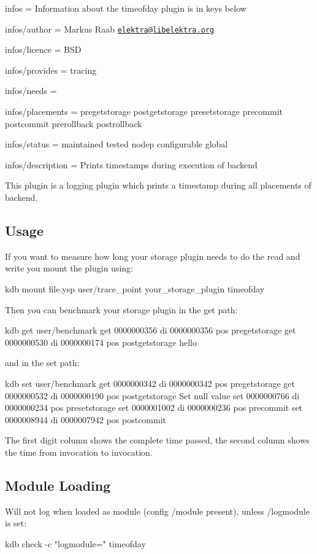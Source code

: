 
\begin{DoxyItemize}
\item infos = Information about the timeofday plugin is in keys below
\item infos/author = Markus Raab \href{mailto:elektra@libelektra.org}{\tt elektra@libelektra.\+org}
\item infos/licence = B\+SD
\item infos/provides = tracing
\item infos/needs =
\item infos/placements = pregetstorage postgetstorage presetstorage precommit postcommit prerollback postrollback
\item infos/status = maintained tested nodep configurable global
\item infos/description = Prints timestamps during execution of backend
\end{DoxyItemize}

This plugin is a logging plugin which prints a timestamp during all placements of backend.

\subsection*{Usage}

If you want to measure how long your storage plugin needs to do the read and write you mount the plugin using\+: \begin{DoxyVerb}kdb mount file.ysp user/trace_point your_storage_plugin timeofday
\end{DoxyVerb}


Then you can benchmark your storage plugin in the get path\+: \begin{DoxyVerb}kdb get user/benchmark
get     0000000356      di      0000000356      pos     pregetstorage
get     0000000530      di      0000000174      pos     postgetstorage
hello
\end{DoxyVerb}


and in the set path\+: \begin{DoxyVerb}kdb set user/benchmark
get     0000000342      di      0000000342      pos     pregetstorage
get     0000000532      di      0000000190      pos     postgetstorage
Set null value
set     0000000766      di      0000000234      pos     presetstorage
set     0000001002      di      0000000236      pos     precommit
set     0000008944      di      0000007942      pos     postcommit
\end{DoxyVerb}


The first digit column shows the complete time passed, the second column shows the time from invocation to invocation.

\subsection*{Module Loading}

Will not log when loaded as module (config {\ttfamily /module} present), unless {\ttfamily /logmodule} is set\+: \begin{DoxyVerb}kdb check -c "logmodule=" timeofday\end{DoxyVerb}
 